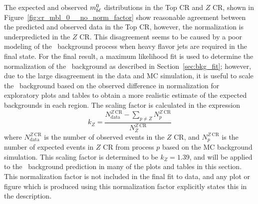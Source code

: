 The expected and observed $m_{b\ell}^{0}$ distributions in the Top CR and $Z$ CR,
shown in Figure~\ref{fig:cr_mbl_0__no_norm_factor} show reasonable agreement
between the predicted and observed data in the Top CR, however, the
normalization is underpredicted in the $Z$ CR.
This disagreement seems to be caused by a poor modeling of the
\ZGAMMAJETS\ background process when heavy flavor jets are required in the
final state.
For the final result, a maximum likelihood fit is used to determine the
normalization of the \ZGAMMAJETS\ background as described in
Section~\ref{sec:bkg_fit}; however, due to the large disagreement in the
data and MC simulation, it is useful to scale the \ZGAMMAJETS\ background based
on the observed difference in normalization for exploratory plots and tables to
obtain a more realistic estimate of the expected backgrounds in each region.
The scaling factor is calculated in the expression
\begin{equation}
  k_Z = \frac{N_\mathrm{data}^{Z~\mathrm{CR}} -
                \sum_{p \neq Z}N_{p}^{Z~\mathrm{CR}} }
             {N_{Z}^{Z~\mathrm{CR}}}
\end{equation}
where $N_\mathrm{data}^{Z~\mathrm{CR}}$ is the number of observed events in
the $Z$ CR, and $N_{p}^{Z~\mathrm{CR}}$ is the number of expected events in
$Z$ CR from process $p$ based on the MC background simulation.
This scaling factor is determined to be $k_Z = 1.39$, and will be applied to
the \ZGAMMAJETS\ background prediction in many of the plots and tables in this
section.
This normalization factor is not included in the final fit to data, and any plot
or figure which is produced using this normalization factor explicitly
states this in the description.

